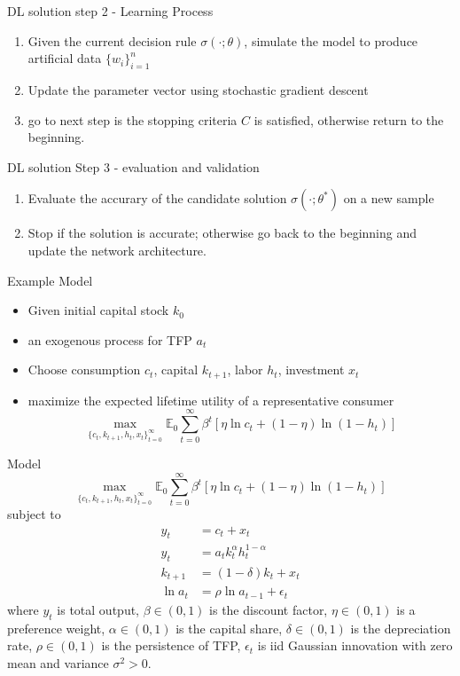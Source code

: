 \documentclass[aspectratio=169]{beamer} %
\begin{document}
\begin{frame}{DL solution step 2 - Learning Process}
\begin{enumerate}
    \item Given the current decision rule $\sigma(\cdot;\theta)$, simulate the model to produce artificial data $\{w_i\}_{i=1}^n$
    \item Update the parameter vector using stochastic gradient descent
    \item go to next step is the stopping criteria $C$ is satisfied, otherwise return to the beginning.
\end{enumerate}

    
\end{frame}


\begin{frame}{DL solution Step 3 - evaluation and validation}
\begin{enumerate}
    \item Evaluate the accurary of the candidate solution $\sigma(\cdot; \theta^*)$ on a new sample
    \item Stop if the solution is accurate; otherwise go back to the beginning and update the network architecture. 
\end{enumerate}
\end{frame}


\begin{frame}{Example Model}
\begin{itemize}
    \item Given initial capital stock $k_0$
    \item an exogenous process for TFP $a_t$
    \item Choose consumption $c_t$, capital $k_{t+1}$, labor $h_t$, investment $x_t$
    \item maximize the expected lifetime utility of a representative consumer
    $$
    \max_{\{c_t,k_{t+1}, h_t,x_t\}_{t=0}^\infty} \mathbb{E}_0\sum_{t=0}^\infty \beta^t [\eta \ln c_t + (1-\eta)\ln(1-h_t)]
    $$
\end{itemize}

\end{frame}

\begin{frame}{Model}
    $$
    \max_{\{c_t,k_{t+1}, h_t,x_t\}_{t=0}^\infty} \mathbb{E}_0\sum_{t=0}^\infty \beta^t [\eta \ln c_t + (1-\eta)\ln(1-h_t)]
    $$
    subject to 
\begin{align*}
    y_t &= c_t + x_t\\
    y_t &= a_tk_t^\alpha h_t^{1-\alpha}\\
    k_{t+1} &=(1-\delta) k_t + x_t\\
    \ln a_t &= \rho \ln a_{t-1} + \epsilon_t
\end{align*}
where $y_t$ is total output, $\beta\in(0,1)$ is the discount factor, $\eta\in(0,1)$ is a preference weight, $\alpha\in(0,1)$ is the capital share, $\delta\in(0,1)$ is the depreciation rate, $\rho\in(0,1)$ is the persistence of TFP, $\epsilon_t$  is iid Gaussian innovation with zero mean and variance $\sigma^2>0$. 
\end{frame}
\end{document}
